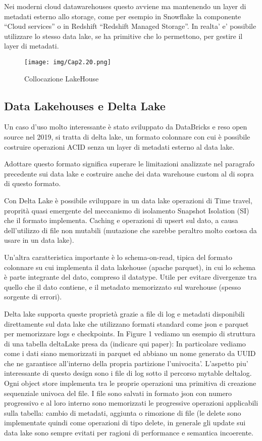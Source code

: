 \documentclass[a4paper,12pt]{report}
\begin{document}
\noindent
Nei moderni cloud datawarehouses questo avviene ma mantenendo un layer di metadati esterno allo storage, come per esempio in Snowflake la componente “Cloud services” o in Redshift “Redshift Managed Storage”. In realta’ e’ possibile utilizzare lo stesso data lake, se ha primitive che lo permettono, per gestire il layer di metadati.

\begin{figure}[h]
    \centering
    \texttt{[image: img/Cap2.20.png]}
    \caption{Collocazione LakeHouse}
\end{figure}
\subsection{Data Lakehouses e Delta Lake}

Un caso d’uso molto interessante è stato sviluppato da DataBricks e reso open source nel 2019, si tratta di delta lake, un formato colonnare con cui è possibile costruire operazioni ACID senza un layer di metadati esterno al data lake. 

\noindent
Adottare questo formato significa superare le limitazioni analizzate nel paragrafo precedente sui data lake e costruire anche dei data warehouse custom al di sopra di questo formato.

\noindent
Con Delta Lake è possibile sviluppare in un data lake operazioni di Time travel, proprità quasi emergente del meccanismo di isolamento Snapshot Isolation (SI) che il formato implementa. Caching e operazioni di upsert sul dato, a causa dell’utilizzo di file non mutabili (mutazione che sarebbe peraltro molto costosa da usare in un data lake). 

\noindent
Un’altra caratteristica importante è lo schema-on-read, tipica del formato colonnare su cui implementa il data lakehouse (apache parquet), in cui lo schema è parte integrante del dato, compreso il datatype. Utile per evitare divergenze tra quello che il dato contiene, e il metadato memorizzato sul warehouse (spesso sorgente di errori).

\noindent
Delta lake supporta queste proprietà grazie a file di log e metadati disponibili direttamente sul data lake che utilizzano formati standard come json e parquet per memorizzare logs e checkpoints. 
In Figure 1 vediamo un esempio di struttura di una tabella deltaLake presa da (indicare qui paper):
In particolare vediamo come i dati siano memorizzati in parquet ed abbiano un nome generato da UUID che ne garantisce all’interno della propria partizione l’univocita’. 
L’aspetto piu’ interessante di questo design sono i file di log sotto il percorso mytable deltalog.
Ogni object store implementa tra le proprie operazioni una primitiva di creazione sequenziale univoca del file. I file sono salvati in formato json con numero progressivo e al loro interno sono memorizzati le progressive operazioni applicabili sulla tabella: 
cambio di metadati, aggiunta o rimozione di file (le delete sono implementate quindi come operazioni di tipo delete, in generale gli update sui data lake sono sempre evitati per ragioni di performance e semantica incoerente. 
\end{document}
